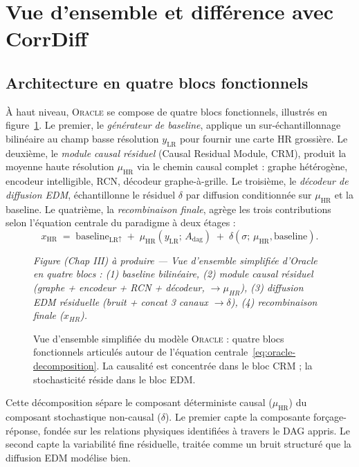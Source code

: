 \documentclass[14pt,a4paper,openany]{extreport}
\theoremstyle{definition}
\newcommand{\Oracle}{\textsc{Oracle}}
\newcommand{\LR}{\ensuremath{\text{LR}}}
\newcommand{\HR}{\ensuremath{\text{HR}}}
\newcommand{\xHR}{\ensuremath{x_{\HR}}}
\newcommand{\yLR}{\ensuremath{y_{\LR}}}
\newcommand{\muHR}{\ensuremath{\mu_{\HR}}}
\newcommand{\Adag}{\ensuremath{A_{\mathrm{dag}}}}
\newcommand{\figplaceholder}[2][0.9\linewidth]{%
  \begin{tcolorbox}[width=#1,height=5cm,valign=center,colback=gray!8,colframe=gray!45,arc=2pt,boxrule=0.5pt]
    \centering\small\textit{#2}
  \end{tcolorbox}%
}
\begin{document}
\section{Vue d'ensemble et différence avec CorrDiff}
\label{sec:oracle-overview}

\subsection{Architecture en quatre blocs fonctionnels}
\label{ssec:oracle-blocs}

À haut niveau, \Oracle{} se compose de quatre blocs fonctionnels, illustrés en figure~\ref{fig:oracle-overview-simple}. Le premier, le \emph{générateur de baseline}, applique un sur-échantillonnage bilinéaire au champ basse résolution $\yLR$ pour fournir une carte HR grossière. Le deuxième, le \emph{module causal résiduel} (Causal Residual Module, CRM), produit la moyenne haute résolution $\muHR$ via le chemin causal complet : graphe hétérogène, encodeur intelligible, RCN, décodeur graphe-à-grille. Le troisième, le \emph{décodeur de diffusion EDM}, échantillonne le résiduel $\delta$ par diffusion conditionnée sur $\muHR$ et la baseline. Le quatrième, la \emph{recombinaison finale}, agrège les trois contributions selon l'équation centrale du paradigme à deux étages :
\begin{equation}
  \xHR \;=\; \mathrm{baseline}_{\LR \uparrow} \;+\; \muHR\!\left(\yLR;\, \Adag\right) \;+\; \delta\!\left(\sigma;\, \muHR, \mathrm{baseline}\right).
  \label{eq:oracle-decomposition}
\end{equation}

\begin{figure}[ht]
  \centering
  \figplaceholder{Figure (Chap III) à produire --- Vue d'ensemble simplifiée d'Oracle en quatre blocs : (1) baseline bilinéaire, (2) module causal résiduel (graphe + encodeur + RCN + décodeur, $\to \mu_{HR}$), (3) diffusion EDM résiduelle (bruit + concat 3 canaux $\to \delta$), (4) recombinaison finale ($x_{HR}$).}
  \caption{Vue d'ensemble simplifiée du modèle \Oracle{} : quatre blocs fonctionnels articulés autour de l'équation centrale~\eqref{eq:oracle-decomposition}. La causalité est concentrée dans le bloc CRM ; la stochasticité réside dans le bloc EDM.}
  \label{fig:oracle-overview-simple}
\end{figure}

Cette décomposition sépare le composant déterministe causal ($\muHR$) du composant stochastique non-causal ($\delta$). Le premier capte la composante forçage-réponse, fondée sur les relations physiques identifiées à travers le DAG appris. Le second capte la variabilité fine résiduelle, traitée comme un bruit structuré que la diffusion EDM modélise bien.
\end{document}
